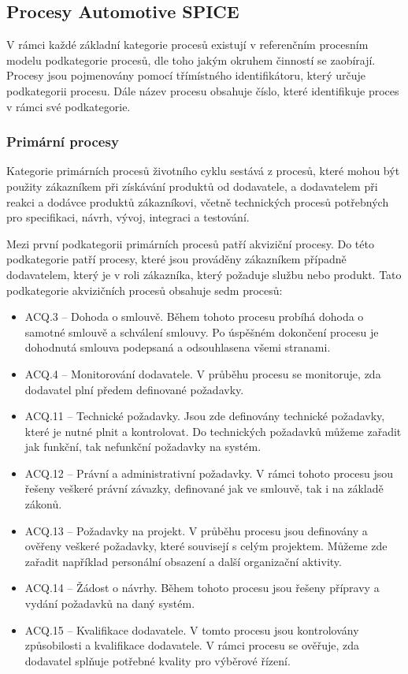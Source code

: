 \documentclass[czech,master,public,dept460,male,cpdeclaration,oneside]{diploma}
\begin{document}

\subsection{Procesy Automotive SPICE}
\label{sec:aspice_processes}
V rámci každé základní kategorie procesů existují v referenčním procesním modelu podkategorie procesů, dle toho jakým okruhem činností se zaobírají. Procesy jsou pojmenovány pomocí třímístného identifikátoru, který určuje podkategorii procesu. Dále název procesu obsahuje číslo, které identifikuje proces v rámci své podkategorie.

\subsubsection{Primární procesy}
Kategorie primárních procesů životního cyklu sestává z procesů, které mohou být použity zákazníkem při získávání produktů od dodavatele, a dodavatelem při reakci a dodávce produktů zákazníkovi, včetně technických procesů potřebných pro specifikaci, návrh, vývoj, integraci a testování.

Mezi první podkategorii primárních procesů patří akviziční procesy. Do této podkategorie patří procesy, které jsou prováděny zákazníkem případně dodavatelem, který je v roli zákazníka, který požaduje  službu nebo produkt. Tato podkategorie akvizičních procesů obsahuje sedm procesů:

\begin{itemize}
	\item ACQ.3 -- Dohoda o smlouvě. Během tohoto procesu probíhá dohoda o samotné smlouvě a schválení smlouvy. Po úspěšném dokončení procesu je dohodnutá smlouva podepsaná a odsouhlasena všemi stranami.
	\item ACQ.4 -- Monitorování dodavatele. V průběhu procesu se monitoruje, zda dodavatel plní předem definované požadavky.
	\item ACQ.11 -- Technické požadavky. Jsou zde definovány technické požadavky, které je nutné plnit a kontrolovat. Do technických požadavků můžeme zařadit jak funkční, tak nefunkční požadavky na systém.
	\item ACQ.12 -- Právní a administrativní požadavky. V rámci tohoto procesu jsou řešeny veškeré právní závazky, definované jak ve smlouvě, tak i  na základě zákonů.
	\item ACQ.13 -- Požadavky na projekt. V průběhu procesu jsou definovány a ověřeny veškeré požadavky, které souvisejí s celým projektem. Můžeme zde zařadit například personální obsazení a další organizační aktivity.
	\item ACQ.14 -- Žádost o návrhy.  Během tohoto procesu jsou řešeny přípravy a vydání požadavků na daný systém.
	\item ACQ.15 -- Kvalifikace dodavatele. V tomto procesu jsou kontrolovány způsobilosti a kvalifikace dodavatele. V rámci procesu se ověřuje, zda dodavatel splňuje potřebné kvality pro výběrové řízení.
\end{itemize}
\end{document}
